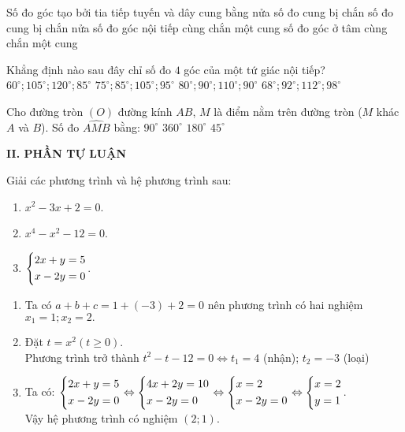 \begin{ex}%
Số đo góc tạo bởi tia tiếp tuyến và dây cung bằng
\choice
{\True nửa số đo cung bị chắn}
{số đo cung bị chắn}
{nửa số đo góc nội tiếp cùng chắn một cung}
{số đo góc ở tâm cùng chắn một cung}

\end{ex}
\begin{ex}%
Khẳng định nào sau đây chỉ số đo $4$ góc của một tứ giác nội tiếp?
\choice
{$60^\circ;105^\circ;120^\circ;85^\circ$}
{\True $75^\circ;85^\circ;105^\circ;95^\circ$}
{$80^\circ;90^\circ;110^\circ;90^\circ$}
{$68^\circ;92^\circ;112^\circ;98^\circ$}

\end{ex}
\begin{ex}%
Cho đường tròn $(O)$ đường kính $AB$, $M$ là điểm nằm trên đường tròn ($M$ khác $A$ và
$B$). Số đo $\widehat{AMB}$ bằng:
\choice
{\True $90^\circ$}
{$360^\circ$}
{$180^\circ$}
{$45^\circ$}
\end{ex}

\noindent\textbf{II. PHẦN TỰ LUẬN}
\setcounter{ex}{0}
\begin{ex}%
      Giải các phương trình và hệ phương trình sau:
    \begin{enumerate}
        \item $x^2-3x+2=0$.
        \item $x^4-x^2-12=0$.
        \item $\left\{\begin{aligned}& 2x+y=5 \\& x-2y=0\end{aligned}\right.$.
    \end{enumerate}
\loigiai
    {
    \begin{enumerate}
      \item Ta có $ a+b+c=1+(-3)+2=0$ nên phương trình có hai nghiệm $x_1=1;x_2=2.$
     \item Đặt $t=x^2\left(t\ge 0\right)$.\\
Phương trình trở thành $t^2-t-12=0\Leftrightarrow t_1=4$ (nhận); $t_2=-3$ (loại)
    \item  Ta có: $\left\{\begin{aligned}
& 2x+y=5 \\
& x-2y=0\end{aligned}\right.\Leftrightarrow \left\{\begin{aligned}
& 4x+2y=10 \\
& x-2y=0\end{aligned}\right.\Leftrightarrow \left\{\begin{aligned}
& x=2 \\
& x-2y=0\end{aligned}\right.\Leftrightarrow \left\{\begin{aligned}
& x=2 \\
& y=1\end{aligned}\right.$.\\
Vậy hệ phương trình có nghiệm $\left(2;1\right)$.
\end{enumerate}
}
\end{ex}

